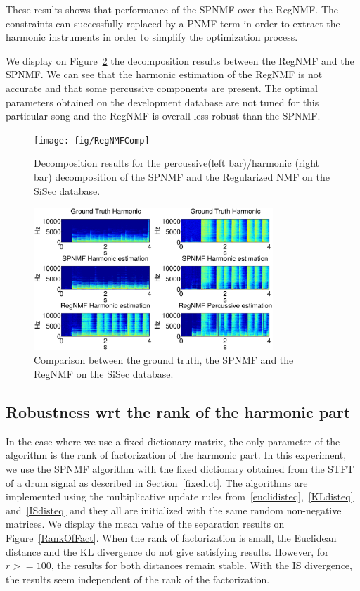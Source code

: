 These results shows that performance of the SPNMF over the RegNMF. The constraints can successfully replaced by a PNMF term in order to extract the harmonic instruments in order to simplify the optimization process. 

We display on Figure~\ref{pnmfshowcase} the decomposition results between the RegNMF and the SPNMF. We can see that the harmonic estimation of the RegNMF is not accurate and that some percussive components are present. The optimal parameters obtained on the development database are not tuned for this particular song and the RegNMF is overall less robust than the SPNMF. 

\begin{figure}[t]

  \centering 
  \texttt{[image: fig/RegNMFComp]}
  \caption{\label{regnmfcomp}Decomposition results for the percussive(left bar)/harmonic (right bar) decomposition of the SPNMF and the Regularized NMF on the SiSec database.}
  
\end{figure}

\begin{figure}[t]

  \centering 
  \includegraphics[width=9cm]{fig/PNMFShowcase}
  \caption{\label{pnmfshowcase}Comparison between the ground truth, the SPNMF and the RegNMF on the SiSec database.}
  
\end{figure}


\subsection{Robustness wrt the rank of the harmonic part}
\label{setup:rank}

In the case where we use a fixed dictionary matrix, the only parameter of the algorithm is the rank of factorization of the harmonic part. In this experiment, we use the SPNMF algorithm with the fixed dictionary obtained from the STFT of a drum signal as described in Section~\ref{fixedict}. The algorithms are implemented using the multiplicative update rules from~\ref{euclidisteq},~\ref{KLdisteq} and~\ref{ISdisteq} and they all are  initialized with the same random non-negative matrices. 
We display the mean value of the separation results on Figure~\ref{RankOfFact}. When the rank of factorization is small, the Euclidean distance and the KL divergence do not give satisfying results. However, for $r>=100$, the results for both distances remain stable. With the IS divergence, the results seem independent of the rank of the factorization.


